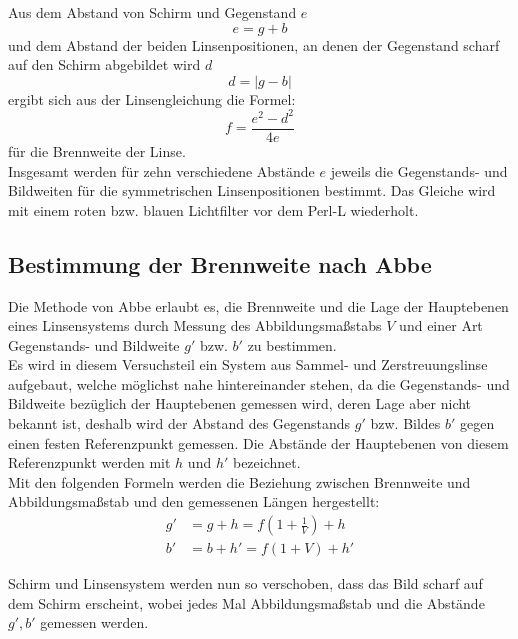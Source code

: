 Aus dem Abstand von Schirm und Gegenstand $e$
%
\begin{equation}
  e = g + b
\end{equation} 
%
und dem Abstand der beiden Linsenpositionen, an denen der Gegenstand
scharf auf den Schirm abgebildet wird $d$ 
%
\begin{equation}
  d = |g - b|
\end{equation}
%
ergibt sich aus der Linsengleichung die Formel:
%
\begin{equation} 
f = \frac{e^2 - d^2}{4e}
\end{equation}
%
für die Brennweite der Linse.\\
Insgesamt werden für zehn verschiedene
Abstände $e$ jeweils die Gegenstands- und Bildweiten für die
symmetrischen Linsenpositionen bestimmt.
Das Gleiche wird mit einem roten bzw. blauen Lichtfilter vor dem Perl-L wiederholt.

\subsection{Bestimmung der Brennweite nach Abbe}

Die Methode von Abbe erlaubt es, die Brennweite und die Lage der
Hauptebenen eines Linsensystems durch Messung des Abbildungsmaßstabs $V$
und einer Art Gegenstands- und Bildweite $g'$ bzw. $b'$ zu bestimmen.\\
Es wird in diesem Versuchsteil ein System aus Sammel- und Zerstreuungslinse
aufgebaut, welche möglichst nahe hintereinander stehen, da die Gegenstands- und Bildweite bezüglich der Hauptebenen gemessen wird, deren Lage aber nicht bekannt ist, deshalb wird der Abstand des Gegenstands $g'$
bzw. Bildes $b'$ gegen einen festen Referenzpunkt gemessen. Die Abstände der Hauptebenen von diesem Referenzpunkt werden mit $h$ und $h'$
bezeichnet.\\
Mit den folgenden Formeln werden die Beziehung zwischen
Brennweite und Abbildungsmaßstab und den gemessenen Längen hergestellt:
%
\begin{align}
  g' &= g + h  = f \left(1 + \frac{1}{V}\right) + h\\
  b' &= b + h' = f (1 + V) + h'
\end{align}

Schirm und Linsensystem werden nun so verschoben, dass das Bild
scharf auf dem Schirm erscheint, wobei jedes Mal Abbildungsmaßstab und
die Abstände $g', b'$ gemessen werden.
